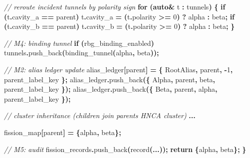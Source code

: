 \documentclass[
  11pt,
  a4paper,
]{article}
\newenvironment{Shaded}{\begin{snugshade}}{\end{snugshade}}
\newcommand{\CommentTok}[1]{\textcolor[rgb]{0.56,0.35,0.01}{\textit{#1}}}
\newcommand{\ControlFlowTok}[1]{\textcolor[rgb]{0.13,0.29,0.53}{\textbf{#1}}}
\newcommand{\DecValTok}[1]{\textcolor[rgb]{0.00,0.00,0.81}{#1}}
\newcommand{\KeywordTok}[1]{\textcolor[rgb]{0.13,0.29,0.53}{\textbf{#1}}}
\newcommand{\NormalTok}[1]{#1}
\newcommand{\OperatorTok}[1]{\textcolor[rgb]{0.81,0.36,0.00}{\textbf{#1}}}
\begin{document}
\begin{Shaded}
\begin{Highlighting}[]
    \CommentTok{// reroute incident tunnels by polarity sign}
    \ControlFlowTok{for} \OperatorTok{(}\KeywordTok{auto}\OperatorTok{\&}\NormalTok{ t }\OperatorTok{:}\NormalTok{ tunnels}\OperatorTok{)} \OperatorTok{\{}
        \ControlFlowTok{if} \OperatorTok{(}\NormalTok{t}\OperatorTok{.}\NormalTok{cavity\_a }\OperatorTok{==}\NormalTok{ parent}\OperatorTok{)}\NormalTok{ t}\OperatorTok{.}\NormalTok{cavity\_a }\OperatorTok{=} \OperatorTok{(}\NormalTok{t}\OperatorTok{.}\NormalTok{polarity }\OperatorTok{\textgreater{}=} \DecValTok{0}\OperatorTok{)} \OperatorTok{?}\NormalTok{ alpha }\OperatorTok{:}\NormalTok{ beta}\OperatorTok{;}
        \ControlFlowTok{if} \OperatorTok{(}\NormalTok{t}\OperatorTok{.}\NormalTok{cavity\_b }\OperatorTok{==}\NormalTok{ parent}\OperatorTok{)}\NormalTok{ t}\OperatorTok{.}\NormalTok{cavity\_b }\OperatorTok{=} \OperatorTok{(}\NormalTok{t}\OperatorTok{.}\NormalTok{polarity }\OperatorTok{\textgreater{}=} \DecValTok{0}\OperatorTok{)} \OperatorTok{?}\NormalTok{ alpha }\OperatorTok{:}\NormalTok{ beta}\OperatorTok{;}
    \OperatorTok{\}}

    \CommentTok{// M4: binding tunnel}
    \ControlFlowTok{if} \OperatorTok{(}\NormalTok{rbg\_binding\_enabled}\OperatorTok{)}\NormalTok{ tunnels}\OperatorTok{.}\NormalTok{push\_back}\OperatorTok{(}\NormalTok{binding\_tunnel}\OperatorTok{(}\NormalTok{alpha}\OperatorTok{,}\NormalTok{ beta}\OperatorTok{));}

    \CommentTok{// M2: alias ledger update}
\NormalTok{    alias\_ledger}\OperatorTok{[}\NormalTok{parent}\OperatorTok{]} \OperatorTok{=} \OperatorTok{\{}\NormalTok{ RootAlias}\OperatorTok{,}\NormalTok{ parent}\OperatorTok{,} \OperatorTok{{-}}\DecValTok{1}\OperatorTok{,}\NormalTok{ parent\_label\_key }\OperatorTok{\};}
\NormalTok{    alias\_ledger}\OperatorTok{.}\NormalTok{push\_back}\OperatorTok{(\{}\NormalTok{ Alpha}\OperatorTok{,}\NormalTok{ parent}\OperatorTok{,}\NormalTok{ beta}\OperatorTok{,}\NormalTok{  parent\_label\_key }\OperatorTok{\});}
\NormalTok{    alias\_ledger}\OperatorTok{.}\NormalTok{push\_back}\OperatorTok{(\{}\NormalTok{ Beta}\OperatorTok{,}\NormalTok{  parent}\OperatorTok{,}\NormalTok{ alpha}\OperatorTok{,}\NormalTok{ parent\_label\_key }\OperatorTok{\});}

    \CommentTok{// cluster inheritance (children join parent\textquotesingle{}s HNCA cluster)}
    \OperatorTok{...}

\NormalTok{    fission\_map}\OperatorTok{[}\NormalTok{parent}\OperatorTok{]} \OperatorTok{=} \OperatorTok{\{}\NormalTok{alpha}\OperatorTok{,}\NormalTok{ beta}\OperatorTok{\};}

    \CommentTok{// M5: audit}
\NormalTok{    fission\_records}\OperatorTok{.}\NormalTok{push\_back}\OperatorTok{(}\NormalTok{record}\OperatorTok{(...));}
    \ControlFlowTok{return} \OperatorTok{\{}\NormalTok{alpha}\OperatorTok{,}\NormalTok{ beta}\OperatorTok{\};}
\OperatorTok{\}}
\end{Highlighting}
\end{Shaded}
\end{document}
